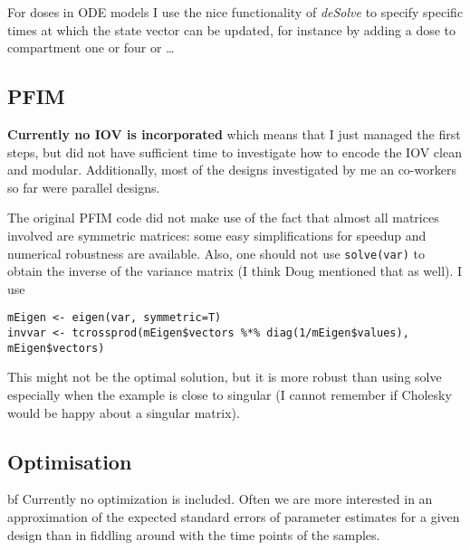 For doses in ODE models I use the nice functionality of {\it deSolve} to specify specific times at which the state vector can be updated, for instance by adding a dose to compartment one or four or \dots

\subsection{PFIM}
{\bf Currently no IOV is incorporated} which means that I just managed the first steps, but did not have sufficient time to investigate how to encode the IOV clean and modular.
Additionally, most of the designs investigated by me an co-workers so far were parallel designs.

The original PFIM code did not make use of the fact that almost all matrices involved are symmetric matrices: some easy simplifications for speedup and numerical robustness are available.
Also, one should not use \verb!solve(var)! to obtain the inverse of the variance matrix (I think Doug mentioned that as well).
I use 
\begin{verbatim}
mEigen <- eigen(var, symmetric=T)
invvar <- tcrossprod(mEigen$vectors %*% diag(1/mEigen$values), mEigen$vectors)
\end{verbatim}
This might not be the optimal solution, but it is more robust than using solve especially when the example is close to singular (I cannot remember if Cholesky would be happy about a singular matrix).

\subsection{Optimisation}
{bf Currently no optimization is included}.
Often we are more interested in an approximation of the expected standard errors of parameter estimates for a given design than in fiddling around with the time points of the samples.
